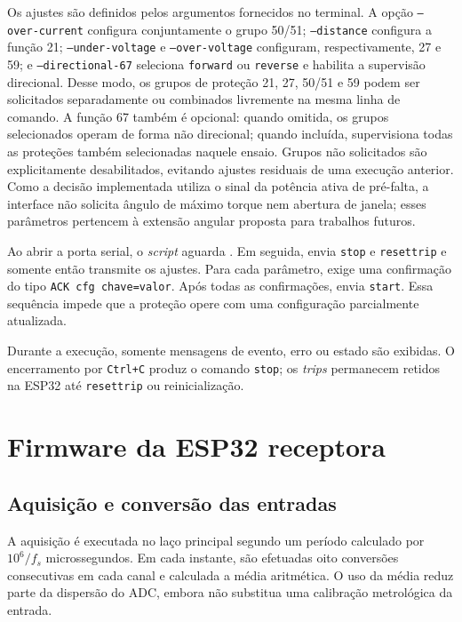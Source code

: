 Os ajustes são definidos pelos argumentos fornecidos no terminal. A opção \texttt{--over-current} configura conjuntamente o grupo 50/51; \texttt{--distance} configura a função 21; \texttt{--under-voltage} e \texttt{--over-voltage} configuram, respectivamente, 27 e 59; e \texttt{--directional-67} seleciona \texttt{forward} ou \texttt{reverse} e habilita a supervisão direcional. Desse modo, os grupos de proteção 21, 27, 50/51 e 59 podem ser solicitados separadamente ou combinados livremente na mesma linha de comando. A função 67 também é opcional: quando omitida, os grupos selecionados operam de forma não direcional; quando incluída, supervisiona todas as proteções também selecionadas naquele ensaio. Grupos não solicitados são explicitamente desabilitados, evitando ajustes residuais de uma execução anterior. Como a decisão implementada utiliza o sinal da potência ativa de pré-falta, a interface não solicita ângulo de máximo torque nem abertura de janela; esses parâmetros pertencem à extensão angular proposta para trabalhos futuros.

Ao abrir a porta serial, o \textit{script} aguarda . Em seguida, envia \texttt{stop} e \texttt{resettrip} e somente então transmite os ajustes. Para cada parâmetro, exige uma confirmação do tipo \texttt{ACK cfg chave=valor}. Após todas as confirmações, envia \texttt{start}. Essa sequência impede que a proteção opere com uma configuração parcialmente atualizada.

Durante a execução, somente mensagens de evento, erro ou estado são exibidas. O encerramento por \texttt{Ctrl+C} produz o comando \texttt{stop}; os \textit{trips} permanecem retidos na ESP32 até \texttt{resettrip} ou reinicialização.

\section{Firmware da ESP32 receptora}

\subsection{Aquisição e conversão das entradas}

A aquisição é executada no laço principal segundo um período calculado por $10^6/f_s$ microssegundos. Em cada instante, são efetuadas oito conversões consecutivas em cada canal e calculada a média aritmética. O uso da média reduz parte da dispersão do ADC, embora não substitua uma calibração metrológica da entrada.

